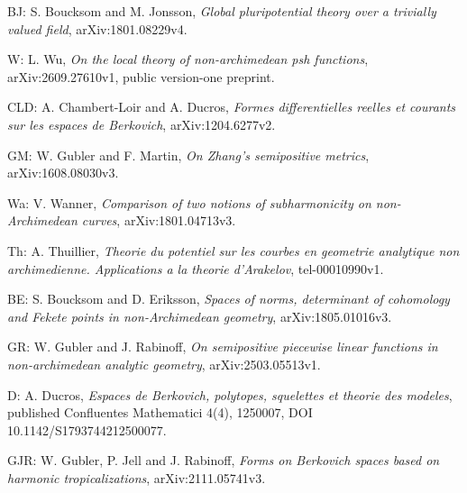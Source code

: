 \documentclass[
  11pt,
]{article}
\begin{document}
BJ: S. Boucksom and M. Jonsson, \emph{Global pluripotential theory over
a trivially valued field}, arXiv:1801.08229v4.

W: L. Wu, \emph{On the local theory of non-archimedean psh functions},
arXiv:2609.27610v1, public version-one preprint.

CLD: A. Chambert-Loir and A. Ducros, \emph{Formes differentielles
reelles et courants sur les espaces de Berkovich}, arXiv:1204.6277v2.

GM: W. Gubler and F. Martin, \emph{On Zhang's semipositive metrics},
arXiv:1608.08030v3.

Wa: V. Wanner, \emph{Comparison of two notions of subharmonicity on
non-Archimedean curves}, arXiv:1801.04713v3.

Th: A. Thuillier, \emph{Theorie du potentiel sur les courbes en
geometrie analytique non archimedienne. Applications a la theorie
d'Arakelov}, tel-00010990v1.

BE: S. Boucksom and D. Eriksson, \emph{Spaces of norms, determinant of
cohomology and Fekete points in non-Archimedean geometry},
arXiv:1805.01016v3.

GR: W. Gubler and J. Rabinoff, \emph{On semipositive piecewise linear
functions in non-archimedean analytic geometry}, arXiv:2503.05513v1.

D: A. Ducros, \emph{Espaces de Berkovich, polytopes, squelettes et
theorie des modeles}, published Confluentes Mathematici 4(4), 1250007,
DOI 10.1142/S1793744212500077.

GJR: W. Gubler, P. Jell and J. Rabinoff, \emph{Forms on Berkovich spaces
based on harmonic tropicalizations}, arXiv:2111.05741v3.
\end{document}
